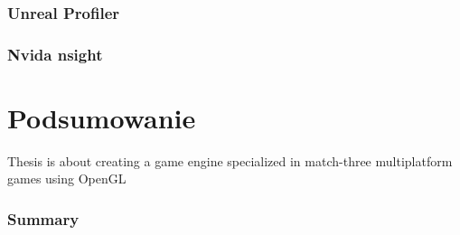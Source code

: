 \documentclass{beamer}
\begin{document}
        \frametitle{Unreal Profiler}
        {
          \begin{frame}
          \end{frame}
          }

          \frametitle{Nvida nsight}
          {
            \begin{frame}
            \end{frame}
            }
        
    \section{Podsumowanie}
\begin{frame}
    Thesis is about creating a game engine specialized in match-three multiplatform games using OpenGL
    \frametitle{Summary}
    \end{frame}
\end{document}
